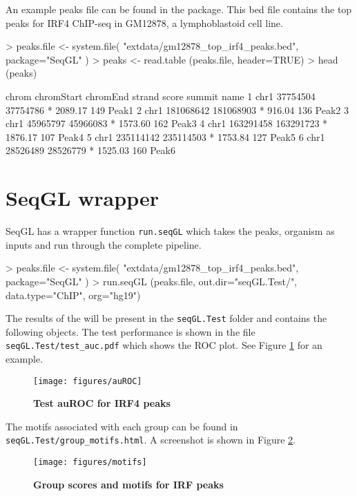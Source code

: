 \documentclass[10pt,oneside]{article}
\begin{document}
An example peaks file can be found in the package. This bed file contains the top peaks for IRF4 ChIP-seq in GM12878, a lymphoblastoid cell line.
\begin{Schunk}
\begin{Sinput}
> peaks.file <- system.file( "extdata/gm12878_top_irf4_peaks.bed", package="SeqGL" )
> peaks <- read.table (peaks.file, header=TRUE)
> head (peaks)
\end{Sinput}
\begin{Soutput}
  chrom chromStart  chromEnd strand   score summit  name
1  chr1   37754504  37754786      * 2089.17    149 Peak1
2  chr1  181068642 181068903      *  916.04    136 Peak2
3  chr1   45965797  45966083      * 1573.60    162 Peak3
4  chr1  163291458 163291723      * 1876.17    107 Peak4
5  chr1  235114142 235114503      * 1753.84    127 Peak5
6  chr1   28526489  28526779      * 1525.03    160 Peak6
\end{Soutput}
\end{Schunk}


\section{SeqGL wrapper}
SeqGL has a wrapper function \texttt{run.seqGL} which takes the peaks, organism as inputs and run through the complete pipeline.
\begin{Schunk}
\begin{Sinput}
> peaks.file <- system.file( "extdata/gm12878_top_irf4_peaks.bed", package="SeqGL" )
> run.seqGL (peaks.file, out.dir="seqGL.Test/", data.type="ChIP", org="hg19")
\end{Sinput}
\end{Schunk}

The results of the will be present in the \texttt{seqGL.Test} folder and contains the following objects. 
The test performance is shown in the file \texttt{seqGL.Test/test\_auc.pdf} which shows the ROC plot. See Figure \ref{fig:fig1} for an example.

\begin{figure}[h!]
\begin{center}
\texttt{[image: figures/auROC]}
\end{center}
\caption{\textbf{Test auROC for IRF4 peaks}}\label{fig:fig1}
\end{figure}

The motifs associated with each group can be found in \texttt{seqGL.Test/group\_motifs.html}. A screenshot is shown in Figure \ref{fig:fig2}.
\begin{figure}[h!]
\begin{center}
\texttt{[image: figures/motifs]}
\end{center}
\caption{\textbf{Group scores and motifs for IRF peaks}}\label{fig:fig2}
\end{figure}
\end{document}
